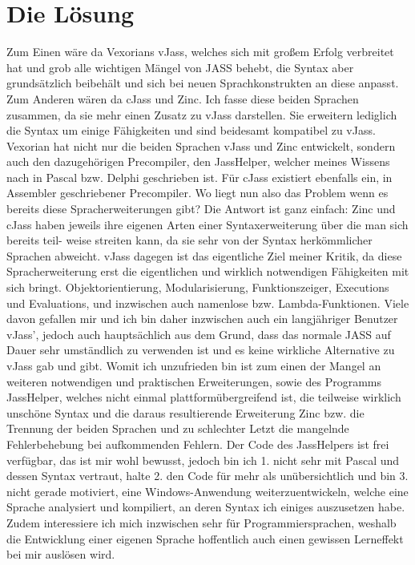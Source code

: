 \section { Die Lösung }
Zum Einen wäre da Vexorians vJass, welches sich mit großem Erfolg verbreitet hat und grob alle wichtigen Mängel von JASS behebt, die
Syntax aber grundsätzlich beibehält und sich bei neuen Sprachkonstrukten an diese anpasst.
Zum Anderen wären da cJass und Zinc. Ich fasse diese beiden Sprachen zusammen, da sie mehr einen Zusatz zu vJass darstellen.
Sie erweitern lediglich die Syntax um einige Fähigkeiten und sind beidesamt kompatibel zu vJass.
Vexorian hat nicht nur die beiden Sprachen vJass und Zinc entwickelt, sondern auch den dazugehörigen Precompiler, den JassHelper,
welcher meines Wissens nach in Pascal bzw. Delphi geschrieben ist.
Für cJass existiert ebenfalls ein, in Assembler geschriebener Precompiler.
Wo liegt nun also das Problem wenn es bereits diese Spracherweiterungen gibt?
Die Antwort ist ganz einfach: Zinc und cJass haben jeweils ihre eigenen Arten einer Syntaxerweiterung über die man sich bereits teil-
weise streiten kann, da sie sehr von der Syntax herkömmlicher Sprachen abweicht.
vJass dagegen ist das eigentliche Ziel meiner Kritik, da diese Spracherweiterung erst die eigentlichen und wirklich notwendigen Fähigkeiten
mit sich bringt. Objektorientierung, Modularisierung, Funktionszeiger, Executions und Evaluations, und inzwischen auch namenlose bzw. Lambda-Funktionen.
Viele davon gefallen mir und ich bin daher inzwischen auch ein langjähriger Benutzer vJass', jedoch auch hauptsächlich aus dem Grund, dass das normale
JASS auf Dauer sehr umständlich zu verwenden ist und es keine wirkliche Alternative zu vJass gab und gibt.
Womit ich unzufrieden bin ist zum einen der Mangel an weiteren notwendigen und praktischen Erweiterungen, sowie des Programms
JassHelper, welches nicht einmal plattformübergreifend ist, die teilweise wirklich unschöne Syntax und die daraus resultierende Erweiterung Zinc bzw.
die Trennung der beiden Sprachen und zu schlechter Letzt die mangelnde Fehlerbehebung bei aufkommenden Fehlern.
Der Code des JassHelpers ist frei verfügbar, das ist mir wohl bewusst, jedoch bin ich 1. nicht sehr mit Pascal und dessen Syntax vertraut, halte 2.
den Code für mehr als unübersichtlich und bin 3. nicht gerade motiviert, eine Windows-Anwendung weiterzuentwickeln, welche eine Sprache analysiert
und kompiliert, an deren Syntax ich einiges auszusetzen habe.
Zudem interessiere ich mich inzwischen sehr für Programmiersprachen, weshalb die Entwicklung einer eigenen Sprache hoffentlich auch einen gewissen
Lerneffekt bei mir auslösen wird.

